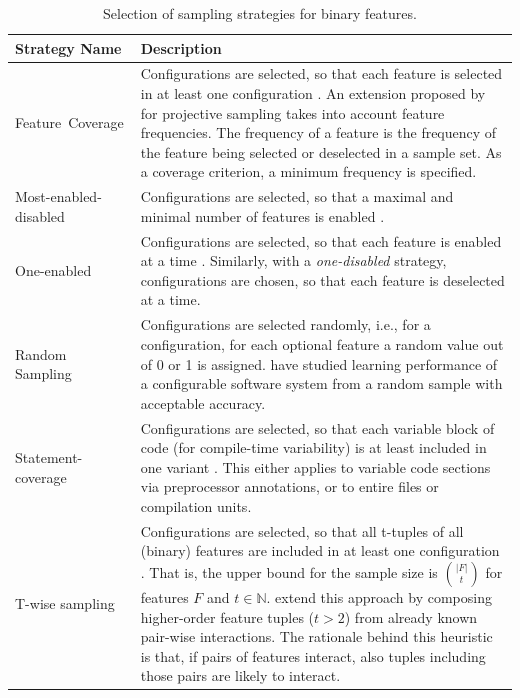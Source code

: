 \begin{table}[h!]
	\centering
	\begin{tabular}{p{}p{}}
	\toprule
	\textbf{Strategy Name} & \textbf{Description} \\
	\midrule
	\mbox{Feature Coverage} & Configurations are selected, so
	that each feature is selected in at least one configuration
  \citep{apel_feature-oriented_2013}. An extension proposed by
  \cite{sarkar_cost-efficient_2015} for projective sampling takes into account feature frequencies. The frequency of a feature is the frequency of the feature being selected or deselected in a sample set. As a coverage criterion, a minimum frequency is specified.\\
  \midrule
  Most-enabled-disabled & Configurations are selected, so that a
  maximal and minimal number of features is enabled
  \citep{medeiros_comparison_2016}. \\
  \midrule
  One-enabled & Configurations are selected, so
  that each feature is enabled at a time \citep{siegmund_predicting_2012}. Similarly, with a
  \emph{one-disabled} strategy, configurations are chosen, so that each feature
  is deselected at a time. \\
  \midrule
  Random Sampling & Configurations are selected randomly, i.e., for a
  configuration, for each optional feature a random value out of 0 or 1 is
  assigned. \cite{guo_variability-aware_2013} have studied learning performance
  of a configurable software system from a random sample with acceptable
  accuracy. \\
  \midrule
  Statement-coverage & Configurations are
  selected, so that each variable block of code (for
  compile-time variability) is at least included in one
  variant \citep{tartler_static_2014}. This either applies to variable code
  sections via preprocessor annotations, or to entire files or compilation
  units. \\
  \midrule
  T-wise sampling & Configurations are selected, so that all
  t-tuples of all (binary) features are included in at least one configuration
  \citep{williams_practical_1996}. That is, the upper bound for the sample size
  is $\binom{|F|}{t}$ for features $F$ and $t \in \mathbb{N}$.
  \cite{siegmund_predicting_2012} extend this approach by composing
  higher-order feature tuples ($t > 2$) from already known pair-wise
  interactions. The rationale behind this heuristic is that, if pairs of
  features interact, also tuples including those pairs are likely to interact.\\
	\bottomrule
	\end{tabular}
	\caption{Selection of sampling strategies for binary features.}
	\label{tab:sampling}
\end{table}

